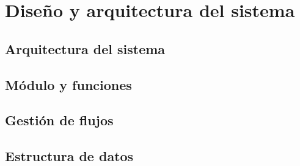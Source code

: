 \chapter{Diseño y arquitectura del sistema}

\section{Arquitectura del sistema}

\section{Módulo y funciones}

\section{Gestión de flujos}

\section{Estructura de datos}

